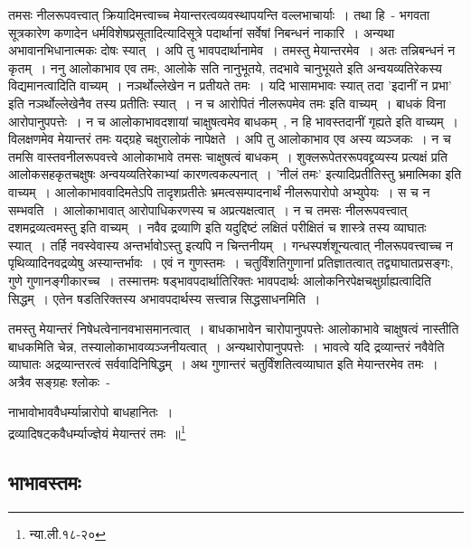 		तमसः नीलरूपवत्त्वात् क्रियादिमत्त्वाच्च मेयान्तरत्वव्यवस्थापयन्ति वल्लभाचार्याः~। तथा हि~- भगवता सूत्रकारेण कणादेन धर्मविशेषप्रसूतादित्यादिसूत्रे पदार्थानां सर्वेषां निबन्धनं नाकारि~। अन्यथा अभावानभिधानात्मकः दोषः स्यात्~। अपि तु भावपदार्थानामेव~। तमस्तु मेयान्तरमेव~। अतः तन्निबन्धनं न कृतम्~। ननु आलोकाभाव एव तमः, आलोके सति नानुभूतये, तदभावे चानुभूयते इति अन्वयव्यतिरेकस्य विद्यमानत्वादिति वाच्यम्~। नञर्थोल्लेखेन न प्रतीयते तमः~। यदि भासामभावः‌ स्यात् तदा 'इदानीं न प्रभा' इति नञर्थोल्लेखेनैव तस्य प्रतीतिः स्यात्~। न च आरोपितं नीलरूपमेव तमः इति वाच्यम्~। बाधकं विना आरोपानुपपत्तेः~। न च आलोकाभावदशायां चाक्षुषत्वमेव बाधकम्~, न हि भावस्तदानीं गृह्यते  इति वाच्यम्~। विलक्षणमेव मेयान्तरं तमः यद्ग्रहे चक्षुरालोकं नापेक्षते~। अपि तु आलोकाभाव एव अस्य व्यञ्जकः~। न च तमसि वास्तवनीलरूपवत्त्वे आलोकाभावे तमसः चाक्षुषत्वं बाधकम्~। शुक्लरूपेतररूपवद्द्रव्यस्य प्रत्यक्षं प्रति आलोकसहकृतचक्षुषः अन्वयव्यतिरेकाभ्यां कारणत्वकल्पनात्~। 'नीलं तमः' इत्यादिप्रतीतिस्तु भ्रमात्मिका इति वाच्यम्~। आलोकाभाववादिमतेऽपि तादृशप्रतीतेः भ्रमत्वसम्पादनार्थं नीलरूपारोपो अभ्युपेयः~। स च न सम्भवति~। आलोकाभावात् आरोपाधिकरणस्य च अप्रत्यक्षत्वात्~। न च तमसः नीलरूपवत्त्वात् दशमद्रव्यत्वमस्तु इति वाच्यम्~। नवैव द्रव्याणि इति यदुद्दिष्टं लक्षितं परीक्षितं च शास्त्रे तस्य व्याघातः स्यात्~। तर्हि नवस्वेवास्य अन्तर्भावोऽस्तु इत्यपि न चिन्तनीयम्~। गन्धस्पर्शशून्यत्वात् नीलरूपवत्त्वाच्च न पृथिव्यादिनवद्रव्येषु अस्यान्तर्भावः~। एवं न गुणस्तमः~। चतुर्विंशतिगुणानां प्रतिज्ञातत्वात् तद्व्याघातप्रसङ्गः, गुणे गुणानङ्गीकारच्च~। तस्मात्तमः षड्भावपदार्थातिरिक्तः भावपदार्थः आलोकनिरपेक्षचक्षुर्ग्राह्यत्वादिति सिद्धम्~। एतेन षडतिरिक्तस्य अभावपदार्थस्य सत्त्वान्न सिद्धसाधनमिति~।

		{\fontsize{11.7}{0}\selectfont\s तमस्तु मेयान्तरं निषेधत्वेनानवभासमानत्वात्~। बाधकाभावेन चारोपानुपपत्तेः आलोकाभावे चाक्षुषत्वं नास्तीति बाधकमिति चेन्न, तस्यालोकाभावव्यञ्जनीयत्वात्~। अन्यथारोपानुपपत्तेः~। भावत्वे यदि द्रव्यान्तरं नवैवेति व्याघातः अद्रव्यान्तरत्वं सर्ववादिनिषिद्धम्~। अथ गुणान्तरं चतुर्विंशतित्वव्याघात इति मेयान्तरमेव तमः~। अत्रैव सङ्ग्रहः श्लोकः~-\\ \begin{center}नाभावोभाववैधर्म्यान्नारोपो बाधहानितः~।\\[-5mm] द्रव्यादिषट्कवैधर्म्याज्ज्ञेयं मेयान्तरं तमः~॥\footnote{न्या.ली.१८-२०}\end{center}}


		\subsection{भाभावस्तमः}

